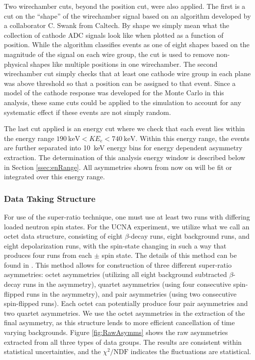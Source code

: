 Two wirechamber cuts, beyond the position cut, were also applied. The first is a cut on the ``shape''
of the wirechamber signal based on an algorithm developed by a collaborator C. Swank from Caltech.
By shape we simply mean what the collection of cathode ADC signals look like when plotted as a
function of position.
While the
algorithm classifies events as one of eight shapes based on the magnitude of
the signal on each wire group, the cut is used to remove non-physical shapes
like multiple positions in one wirechamber. The second wirechamber
cut simply checks that at least one cathode wire group in each plane was above threshold
so that a position can be assigned to that event.
Since a model of the cathode response was
developed for the Monte Carlo in this analysis, these same cuts could be applied to the
simulation to account for any systematic effect if these events are not simply random.

The last cut applied is an energy cut where we check that each event lies within the
energy range $190\mathrm{~keV} < KE_e < 740\mathrm{~keV}$.
Within this energy range, the events are further separated into
10~keV energy bins for energy dependent asymmetry extraction. The determination
of this analysis energy window is described below in Section \ref{ssec:enRange}.
All asymmetries shown from now on
will be fit or integrated over this energy range.

\subsubsection{Data Taking Structure}

For use of the super-ratio technique, one must use at least two runs with differing loaded
neutron spin states. For the UCNA experiment, we utilize what we call an octet data structure,
consisting of eight $\beta$-decay runs, eight background runs, and eight depolarization
runs, with the spin-state changing in such a way that produces
four runs from each $\pm$ spin state.
The details of this method can be found in \cite{plaster2012}. This method allows for
construction of three different super-ratio asymmetries: octet asymmetries (utilizing all eight background subtracted
$\beta$-decay runs in the asymmetry), quartet asymmetries (using four consecutive spin-flipped
runs in the asymmetry), and pair asymmetries (using two consecutive spin-flipped runs). Each octet can potentially
produce four pair asymmetries and two quartet asymmetries. We use
the octet asymmetries in the extraction of the final asymmetry, as this structure lends to more
efficient cancellation of time varying backgrounds. Figure \ref{fig:RawAsymms} shows the
raw asymmetries extracted from all three types of data groups. The results are consistent
within statistical uncertainties, and the $\chi^2/\textrm{NDF}$ indicates the fluctuations
are statistical. 


